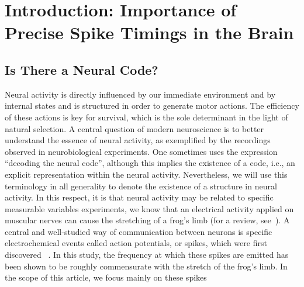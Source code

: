 \documentclass[brainsci, %
               review,accept,pdftex,moreauthors
               ]{Definitions/mdpi}
\begin{document}
%
\section{Introduction: Importance of Precise Spike Timings in the Brain}\label{sec:time}
%
\subsection{Is There a Neural Code?}
Neural activity is directly influenced by our immediate environment and by internal states and is structured in order to generate motor actions. The efficiency of these actions is key for survival, which is the sole determinant in the light of natural selection. A central question of modern neuroscience is to better understand the essence of neural activity, as exemplified by the recordings observed in neurobiological experiments. One sometimes uses the expression ``decoding the neural code'', although this implies the existence of a code, i.e., an explicit representation  within the neural activity. Nevertheless, we will use this terminology in all generality to denote the existence of a structure in neural activity. In this respect, it is  that neural activity may be related to specific measurable variables experiments, we know that an electrical activity applied on muscular nerves can cause the stretching of a frog's limb (for a review, see~\citep{piccolino_luigi_1997}). A central and well-studied way of communication between neurons is specific electrochemical events called action potentials, or spikes, which were first discovered ~\citep{adrian_impulses_1926}. In this study, the frequency at which these spikes are emitted has been shown to be roughly commensurate with the stretch of the frog's limb.
In the scope of this article, we focus mainly on these spikes~
\end{document}
